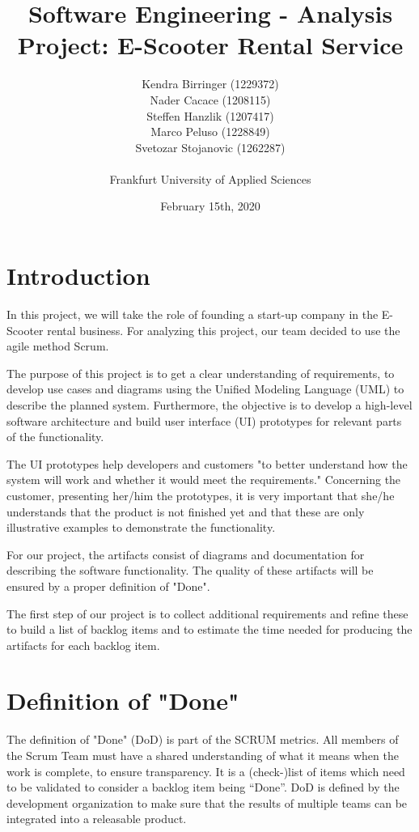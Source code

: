 \documentclass[a4paper, 12pt]{article}
\title{Software Engineering - Analysis\\
Project: E-Scooter Rental Service}
\author{
    Kendra Birringer (1229372)\\
    Nader Cacace (1208115)\\
    Steffen Hanzlik (1207417)\\
    Marco Peluso (1228849)\\
    Svetozar Stojanovic (1262287)\\
    \\
    Frankfurt University of Applied Sciences
}
\date{February 15th, 2020}
\begin{document}
\maketitle
\newpage
\tableofcontents

\newpage
\section{Introduction}
In this project, we will take the role of founding a start-up company in the E-Scooter rental business.
For analyzing this project, our team decided to use the agile method Scrum.

The purpose of this project is to get a clear understanding of requirements, to develop use cases and diagrams using the Unified Modeling Language (UML) to describe the planned system.
Furthermore, the objective is to develop a high-level software architecture and build user interface (UI) prototypes for relevant parts of the functionality.

The UI prototypes help developers and customers "to better understand how the system will work and whether it would meet the requirements." \cite{thoma} 
Concerning the customer, presenting her/him the prototypes, it is very important that she/he understands that the product is not finished yet and that these are only illustrative examples to demonstrate the functionality.

For our project, the artifacts consist of diagrams and documentation for describing the software functionality. The quality of these artifacts will be ensured by a proper definition of "Done".

The first step of our project is to collect additional requirements and refine these to build a list of backlog items and to estimate the time needed for producing the artifacts for each backlog item.

\section{Definition of "Done"}
The definition of "Done" (DoD) is part of the SCRUM metrics. All members of the Scrum Team must have a shared understanding of what it means when the work is complete, to ensure transparency. \cite{scrumguide}
It is a (check-)list of items which need to be validated to consider a backlog item being “Done”. DoD is defined by the development organization to make sure that the results of multiple teams can be integrated into a releasable product. \cite{thoma1}
\end{document}
